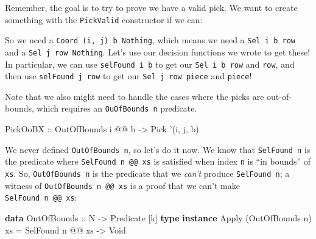 \documentclass[]{article}
\newenvironment{Shaded}{}{}
\newcommand{\DataTypeTok}[1]{\textcolor[rgb]{0.56,0.13,0.00}{#1}}
\newcommand{\FunctionTok}[1]{\textcolor[rgb]{0.02,0.16,0.49}{#1}}
\newcommand{\KeywordTok}[1]{\textcolor[rgb]{0.00,0.44,0.13}{\textbf{#1}}}
\newcommand{\NormalTok}[1]{#1}
\newcommand{\OtherTok}[1]{\textcolor[rgb]{0.00,0.44,0.13}{#1}}
\begin{document}
Remember, the goal is to try to prove we have a valid pick. We want to create
something with the \texttt{PickValid} constructor if we can:

\begin{Shaded}
\end{Shaded}

So we need a
\texttt{Coord\ \textquotesingle{}(i,\ j)\ b\ \textquotesingle{}Nothing}, which
means we need a \texttt{Sel\ i\ b\ row} and a
\texttt{Sel\ j\ row\ \textquotesingle{}Nothing}. Let's use our decision
functions we wrote to get these! In particular, we can use
\texttt{selFound\ i\ b} to get our \texttt{Sel\ i\ b\ row} and \texttt{row}, and
then use \texttt{selFound\ j\ row} to get our \texttt{Sel\ j\ row\ piece} and
\texttt{piece}!

Note that we also might need to handle the cases where the picks are
out-of-bounds, which requires an \texttt{OuOfBounds\ n} predicate.

\begin{Shaded}
\begin{Highlighting}[]
\DataTypeTok{PickOoBX}\OtherTok{   ::} \DataTypeTok{OutOfBounds}\NormalTok{ i }\FunctionTok{@@}\NormalTok{ b }\OtherTok{->} \DataTypeTok{Pick}\NormalTok{ '(i, j, b)}
\end{Highlighting}
\end{Shaded}

We never defined \texttt{OutOfBounds\ n}, so let's do it now. We know that
\texttt{SelFound\ n} is the predicate where \texttt{SelFound\ n\ @@\ xs} is
satisfied when index \texttt{n} is ``in bounds'' of \texttt{xs}. So,
\texttt{OutOfBounds\ n} is the predicate that we \emph{can't} produce
\texttt{SelFound\ n}; a witness of \texttt{OutOfBounds\ n\ @@\ xs} is a proof
that we can't make \texttt{SelFound\ n\ @@\ xs}:

\begin{Shaded}
\begin{Highlighting}[]
\KeywordTok{data} \DataTypeTok{OutOfBounds}\OtherTok{ ::} \DataTypeTok{N} \OtherTok{->} \DataTypeTok{Predicate}\NormalTok{ [k]}
\KeywordTok{type} \KeywordTok{instance} \DataTypeTok{Apply}\NormalTok{ (}\DataTypeTok{OutOfBounds}\NormalTok{ n) xs }\FunctionTok{=} \DataTypeTok{SelFound}\NormalTok{ n }\FunctionTok{@@}\NormalTok{ xs }\OtherTok{->} \DataTypeTok{Void}
\end{Highlighting}
\end{Shaded}
\end{document}
